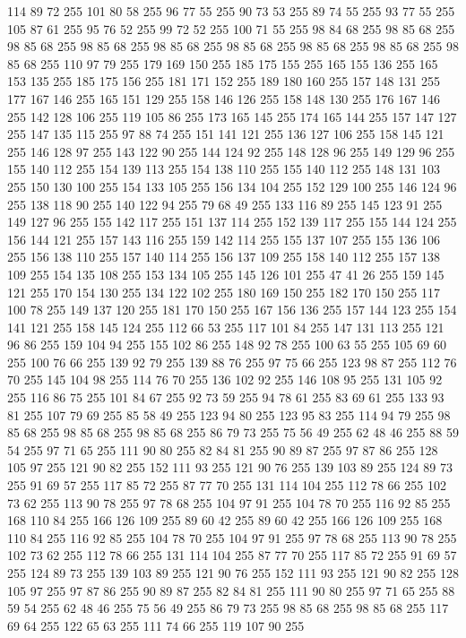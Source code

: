 114 89 72 255 101 80 58 255 96 77 55 255 90 73 53 255 89 74 55 255 93 77 55 255 105 87 61 255 95 76 52 255 99 72 52 255 100 71 55 255 98 84 68 255 98 85 68 255 98 85 68 255 98 85 68 255 98 85 68 255 98 85 68 255 98 85 68 255 98 85 68 255 98 85 68 255 110 97 79 255 179 169 150 255 185 175 155 255 165 155 136 255 165 153 135 255 185 175 156 255 181 171 152 255 189 180 160 255 157 148 131 255 177 167 146 255 165 151 129 255 158 146 126 255 158 148 130 255 176 167 146 255 142 128 106 255 119 105 86 255 173 165 145 255 174 165 144 255 157 147 127 255 147 135 115 255 97 88 74 255 151 141 121 255 136 127 106 255 158 145 121 255 146 128 97 255 143 122 90 255 144 124 92 255 148 128 96 255 149 129 96 255 155 140 112 255 154 139 113 255 154 138 110 255 155 140 112 255 148 131 103 255 150 130 100 255 154 133 105 255 156 134 104 255 152 129 100 255 146 124 96 255 138 118 90 255 140 122 94 255 79 68 49 255 133 116 89 255 145 123 91 255 149 127 96 255
155 142 117 255 151 137 114 255 152 139 117 255 155 144 124 255 156 144 121 255 157 143 116 255 159 142 114 255 155 137 107 255 155 136 106 255 156 138 110 255 157 140 114 255 156 137 109 255 158 140 112 255 157 138 109 255 154 135 108 255 153 134 105 255 145 126 101 255 47 41 26 255 159 145 121 255 170 154 130 255 134 122 102 255 180 169 150 255 182 170 150 255 117 100 78 255 149 137 120 255 181 170 150 255 167 156 136 255 157 144 123 255 154 141 121 255 158 145 124 255 112 66 53 255 117 101 84 255 147 131 113 255 121 96 86 255 159 104 94 255 155 102 86 255 148 92 78 255 100 63 55 255 105 69 60 255 100 76 66 255 139 92 79 255 139 88 76 255 97 75 66 255 123 98 87 255 112 76 70 255 145 104 98 255 114 76 70 255 136 102 92 255 146 108 95 255 131 105 92 255 116 86 75 255 101 84 67 255 92 73 59 255 94 78 61 255 83 69 61 255 133 93 81 255 107 79 69 255 85 58 49 255 123 94 80 255 123 95 83 255 114 94 79 255 98 85 68 255 98 85 68 255 98 85 68 255
86 79 73 255 75 56 49 255 62 48 46 255 88 59 54 255 97 71 65 255 111 90 80 255 82 84 81 255 90 89 87 255 97 87 86 255 128 105 97 255 121 90 82 255 152 111 93 255 121 90 76 255 139 103 89 255 124 89 73 255 91 69 57 255 117 85 72 255 87 77 70 255 131 114 104 255 112 78 66 255 102 73 62 255 113 90 78 255 97 78 68 255 104 97 91 255 104 78 70 255 116 92 85 255 168 110 84 255 166 126 109 255 89 60 42 255 89 60 42 255 166 126 109 255 168 110 84 255 116 92 85 255 104 78 70 255 104 97 91 255 97 78 68 255 113 90 78 255 102 73 62 255 112 78 66 255 131 114 104 255 87 77 70 255 117 85 72 255 91 69 57 255 124 89 73 255 139 103 89 255 121 90 76 255 152 111 93 255 121 90 82 255 128 105 97 255 97 87 86 255 90 89 87 255 82 84 81 255 111 90 80 255 97 71 65 255 88 59 54 255 62 48 46 255 75 56 49 255 86 79 73 255 98 85 68 255 98 85 68 255 117 69 64 255 122 65 63 255 111 74 66 255 119 107 90 255
